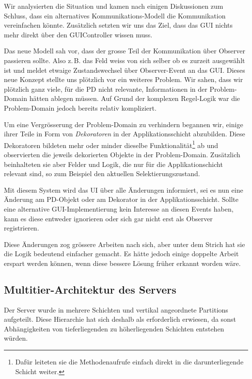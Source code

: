 \documentclass[12pt,halfparskip]{scrartcl}
\begin{document}
Wir analysierten die Situation und kamen nach einigen Diskussionen zum Schluss, dass ein alternatives Kommunikations-Modell die Kommunikation vereinfachen könnte. Zusätzlich setzten wir uns das Ziel, dass das GUI nichts mehr direkt über den GUIController wissen muss. 

Das neue Modell sah vor, dass der grosse Teil der Kommunikation über Observer passieren sollte. Also z.\,B. das Feld weiss von sich selber ob es zurzeit ausgewählt ist und meldet etwaige Zustandswechsel über Observer-Event an das GUI. Dieses neue Konzept stellte uns plötzlich vor ein weiteres Problem. Wir sahen, dass wir plötzlich ganz viele, für die PD nicht relevante, Informationen in der Problem-Domain hätten ablegen müssen. Auf Grund der komplexen Regel-Logik war die Problem-Domain jedoch bereits relativ kompliziert. 

Um eine Vergrösserung der Problem-Domain zu verhindern begannen wir, einige ihrer Teile in Form von \emph{Dekoratoren} in der Applikationsschicht abzubilden. Diese Dekoratoren bildeten mehr oder minder dieselbe Funktionalität\footnote{Dafür leiteten sie die Methodenaufrufe einfach direkt in die darunterliegende Schicht weiter.} ab und observierten die jeweils dekorierten Objekte in der Problem-Domain. Zusätzlich beinhalteten sie aber Felder und Logik, die nur für die Applikationschicht relevant sind, so zum Beispiel den aktuellen Selektierungszustand.

Mit diesem System wird das UI über alle Änderungen informiert, sei es nun eine Änderung am PD-Objekt oder am Dekorator in der Applikationsschicht. Sollte eine alternative GUI-Implementierung kein Interesse an diesen Events haben, kann es diese entweder ignorieren oder sich gar nicht erst als Observer registrieren.

Diese Änderungen zog grössere Arbeiten nach sich, aber unter dem Strich hat sie die Logik bedeutend einfacher gemacht. Es hätte jedoch einige doppelte Arbeit erspart werden können, wenn diese bessere Lösung früher erkannt worden wäre.

\subsection{Multitier-Architektur des Servers}
Der Server wurde in mehrere Schichten und vertikal angeordnete Partitions aufgeteilt. Diese Hierarchie hat sich deshalb als erforderlich erwiesen, da sonst Abhängigkeiten von tieferliegenden zu höherliegenden Schichten entstehen würden.
\end{document}
